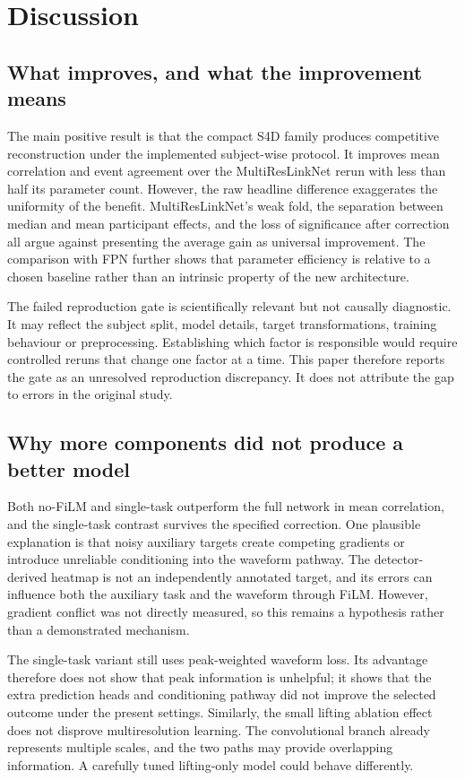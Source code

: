 \documentclass[11pt,a4paper]{article}
\begin{document}
\section{Discussion}

\subsection{What improves, and what the improvement means}

The main positive result is that the compact S4D family produces competitive reconstruction
under the implemented subject-wise protocol. It improves mean correlation and event agreement
over the MultiResLinkNet rerun with less than half its parameter count. However, the raw
headline difference exaggerates the uniformity of the benefit. MultiResLinkNet's weak fold,
the separation between median and mean participant effects, and the loss of significance
after correction all argue against presenting the average gain as universal improvement.
The comparison with FPN further shows that parameter efficiency is relative to a chosen
baseline rather than an intrinsic property of the new architecture.

The failed reproduction gate is scientifically relevant but not causally diagnostic. It
may reflect the subject split, model details, target transformations, training behaviour
or preprocessing. Establishing which factor is responsible would require controlled reruns
that change one factor at a time. This paper therefore reports the gate as an unresolved
reproduction discrepancy. It does not attribute the gap to errors in the original study.

\subsection{Why more components did not produce a better model}

Both no-FiLM and single-task outperform the full network in mean correlation, and the
single-task contrast survives the specified correction. One plausible explanation is that
noisy auxiliary targets create competing gradients or introduce unreliable conditioning
into the waveform pathway. The detector-derived heatmap is not an independently annotated
target, and its errors can influence both the auxiliary task and the waveform through FiLM.
However, gradient conflict was not directly measured, so this remains a hypothesis rather
than a demonstrated mechanism.

The single-task variant still uses peak-weighted waveform loss. Its advantage therefore
does not show that peak information is unhelpful; it shows that the extra prediction heads
and conditioning pathway did not improve the selected outcome under the present settings.
Similarly, the small lifting ablation effect does not disprove multiresolution learning.
The convolutional branch already represents multiple scales, and the two paths may provide
overlapping information. A carefully tuned lifting-only model could behave differently.
\end{document}

